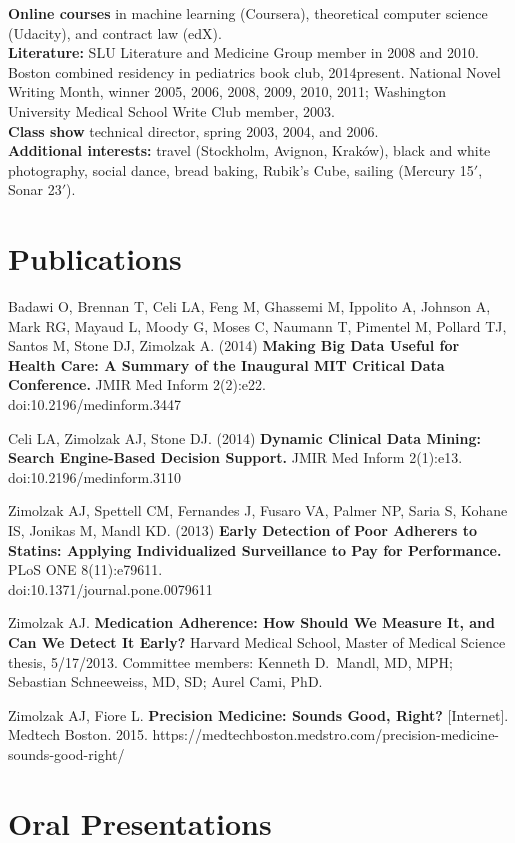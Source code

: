 \documentclass[12pt]{article}
\begin{document}
\textbf{Online courses} in machine learning (Coursera), theoretical
computer science (Udacity), and contract law (edX).\\
\textbf{Literature:} SLU Literature and Medicine Group member in
2008 and 2010. Boston combined residency in pediatrics book club,
2014\ndash{}present. National Novel Writing Month, winner 2005, 2006,
2008, 2009, 2010, 2011; Washington University Medical School Write Club
member, 2003.\\
\textbf{Class show} technical director, spring 2003, 2004, and 2006.\\
\textbf{Additional interests:} travel (Stockholm, Avignon, Krak\'ow),
black and white photography, social dance, bread baking, Rubik’s Cube,
sailing (Mercury 15$'$, Sonar 23$'$).

\section*{Publications}
Badawi O, Brennan T, Celi LA, Feng M, Ghassemi M, Ippolito A, Johnson
A, Mark RG, Mayaud L, Moody G, Moses C, Naumann T, Pimentel M, Pollard
TJ, Santos M, Stone DJ, Zimolzak A. (2014) \textbf{Making Big Data
  Useful for Health Care: A Summary of the Inaugural MIT Critical Data
  Conference.} JMIR Med Inform 2(2):e22.\\
doi:10.2196/medinform.3447

Celi LA, Zimolzak AJ, Stone DJ. (2014) \textbf{Dynamic Clinical Data
  Mining: Search Engine-Based Decision Support.} JMIR Med Inform
2(1):e13. doi:10.2196/medinform.3110

Zimolzak AJ, Spettell CM, Fernandes J, Fusaro VA, Palmer NP, Saria S,
Kohane IS, Jonikas M, Mandl KD. (2013) \textbf{Early Detection of Poor
  Adherers to Statins: Applying Individualized Surveillance to Pay for
  Performance.} PLoS ONE 8(11):e79611. \\
doi:10.1371/journal.pone.0079611

Zimolzak AJ. \textbf{Medication Adherence: How Should We Measure It,
  and Can We Detect It Early?} Harvard Medical School, Master of
Medical Science thesis, 5/17/2013. Committee members: Kenneth
D.\ Mandl, MD, MPH; Sebastian Schneeweiss, MD, SD; Aurel Cami, PhD.

Zimolzak AJ, Fiore L. \textbf{Precision Medicine: Sounds Good, Right?}
[Internet]. Medtech Boston. 2015. 
https://medtechboston.medstro.com/precision-medicine-sounds-good-right/

\section*{Oral Presentations} %
\end{document}
